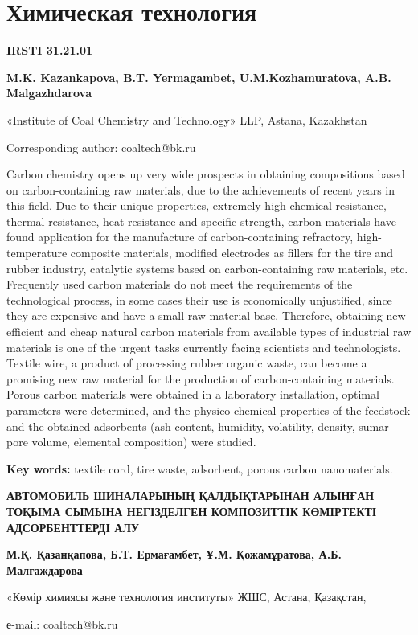 \let\cleardoublepage\clearpage
\chapter{Химическая технология}

{\bfseries IRSTI 31.21.01}


\begin{center}
{\bfseries M.K. Kazankapova, B.T. Yermagambet, U.M.Kozhamuratova, A.B. Malgazhdarova}

«Institute of Coal Chemistry and Technology» LLP, Astana, Kazakhstan

Corresponding author: coaltech@bk.ru
\end{center}

Carbon chemistry opens up very wide prospects in obtaining compositions
based on carbon-containing raw materials, due to the achievements of
recent years in this field. Due to their unique properties, extremely
high chemical resistance, thermal resistance, heat resistance and
specific strength, carbon materials have found application for the
manufacture of carbon-containing refractory, high-temperature composite
materials, modified electrodes as fillers for the tire and rubber
industry, catalytic systems based on carbon-containing raw materials,
etc. Frequently used carbon materials do not meet the requirements of
the technological process, in some cases their use is economically
unjustified, since they are expensive and have a small raw material
base. Therefore, obtaining new efficient and cheap natural carbon
materials from available types of industrial raw materials is one of the
urgent tasks currently facing scientists and technologists. Textile
wire, a product of processing rubber organic waste, can become a
promising new raw material for the production of carbon-containing
materials. Porous carbon materials were obtained in a laboratory
installation, optimal parameters were determined, and the
physico-chemical properties of the feedstock and the obtained adsorbents
(ash content, humidity, volatility, density, sumar pore volume,
elemental composition) were studied.

{\bfseries Key words:} textile cord, tire waste, adsorbent, porous carbon
nanomaterials.

\begin{center}
{\large\bfseries АВТОМОБИЛЬ ШИНАЛАРЫНЫҢ ҚАЛДЫҚТАРЫНАН АЛЫНҒАН ТОҚЫМА СЫМЫНА
НЕГІЗДЕЛГЕН КОМПОЗИТТІК КӨМІРТЕКТІ АДСОРБЕНТТЕРДІ АЛУ}

{\bfseries М.Қ. Қазанқапова, Б.Т. Ермағамбет, Ұ.М. Қожамұратова, А.Б.
Малғаждарова}

«Көмір химиясы және технология институты» ЖШС, Астана, Қазақстан,

е-mail: coaltech@bk.ru
\end{center}

